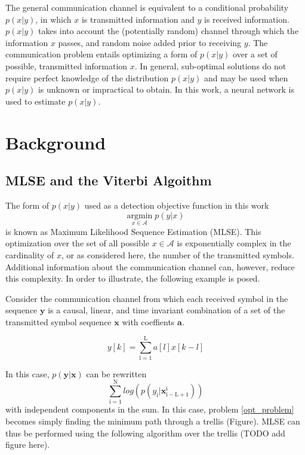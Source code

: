 \documentclass[12pt,a4paper]{report}
\begin{document}
The general communication channel is equivalent to a conditional probability $p(x|y)$, in which $x$ is transmitted information and $y$ is received information.  $p(x|y)$ takes into account the (potentially random) channel through which the information $x$ passes, and random noise added prior to receiving $y$. The communication problem entails optimizing a form of $p(x|y)$ over a set of possible, transmitted information $x$. In general, sub-optimal solutions do not require perfect knowledge of the distribution $p(x|y)$ and may be used when $p(x|y)$ is unknown or impractical to obtain. In this work, a neural network is used to estimate $p(x|y)$.

\section{Background}

\subsection{MLSE and the Viterbi Algoithm}
The form of $p(x|y)$ used as a detection objective function in this work 
\begin{equation}\label{opt_problem}
\underset{x \in \textit{$\mathcal{A}$}}{\text{argmin}} \; p(y|x)
\end{equation}
is known as Maximum Likelihood Sequence Estimation (MLSE).
This optimization over the set of all possible $x \in \mathcal{A}$ is exponentially complex in the cardinality of $x$, or as considered here, the number of the transmitted symbols. Additional information about the communication channel can, however, reduce this complexity. In order to illustrate, the following example is posed.
\par
Consider the communication channel from which each received symbol in the sequence $\mathbf{y}$ is a causal, linear, and time invariant combination of a set of the transmitted symbol sequence $\mathbf{x}$ with coeffients $\mathbf{a}$. 

\begin{equation}
y[k] = \sum_{\mathrm{l=1}}^{\mathrm{L}} a[l]x[k-l]
\end{equation}

In this case, $p(\mathbf{y}|\mathbf{x})$ can be rewritten 
\begin{equation}
\sum_{\mathrm{i=1}}^{\mathrm{N}}log(p(y_{\mathrm{i}}|\mathbf{x}_{\mathrm{i-L+1}}^{\mathrm{i}}) )
\end{equation}
with independent components in the sum. In this case, problem \eqref{opt_problem} becomes simply finding the minimum path through a trellis (Figure).
MLSE can thus be performed using the following algorithm over the trellis (TODO add figure here). 
\\
\end{document}
